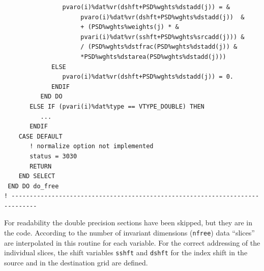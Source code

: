 \documentclass[11pt,twoside]{article}
\begin{document}
\begin{itemize}
\begin{verbatim}
                pvaro(i)%dat%vr(dshft+PSD%wghts%dstadd(j)) = &
                     pvaro(i)%dat%vr(dshft+PSD%wghts%dstadd(j))  &  
                     + (PSD%wghts%weights(j) * &
                     pvari(i)%dat%vr(sshft+PSD%wghts%srcadd(j))) &
                     / (PSD%wghts%dstfrac(PSD%wghts%dstadd(j)) &
                     *PSD%wghts%dstarea(PSD%wghts%dstadd(j))) 
             ELSE
                pvaro(i)%dat%vr(dshft+PSD%wghts%dstadd(j)) = 0.
             ENDIF
          END DO
       ELSE IF (pvari(i)%dat%type == VTYPE_DOUBLE) THEN             
          ... 
       ENDIF
    CASE DEFAULT
       ! normalize option not implemented
       status = 3030
       RETURN
    END SELECT
 END DO do_free
! -----------------------------------------------------------------------------
\end{verbatim}
For readability the double precision sections have been
skipped, but they are in the code.
According to the number of invariant dimensions (\verb|nfree|) data
``slices'' are interpolated in this routine for each variable. For the
correct addressing of the individual slices, the shift
variables \verb|sshft| and \verb|dshft| for the index shift in the
source and in the destination grid are defined.
\end{itemize}
\end{document}
